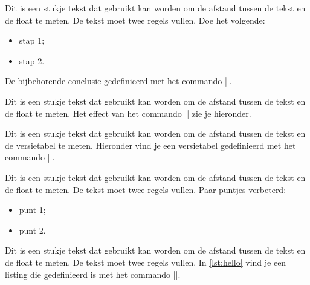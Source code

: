 \begin{llstShortInline}
Dit is een stukje tekst dat gebruikt kan worden om de afstand tussen de tekst en de float te meten. 
De tekst moet twee regels vullen. 
Doe het volgende:
\begin{itemize}
	\item stap 1;
	\item stap 2.
\end{itemize}

De bijbehorende conclusie gedefinieerd met het commando |\conclusie|.


Dit is een stukje tekst dat gebruikt kan worden om de afstand tussen de tekst en de float te meten. 
Het effect van het commando |\handtekening| zie je hieronder. 

\handtekening{}

\clearpage
Dit is een stukje tekst dat gebruikt kan worden om de afstand tussen de tekst en de versietabel te meten. 
Hieronder vind je een versietabel gedefinieerd met het commando |\versiehistorie|. 


Dit is een stukje tekst dat gebruikt kan worden om de afstand tussen de tekst en de float te meten. 
De tekst moet twee regels vullen. Paar puntjes verbeterd:
\begin{itemize}
	\item punt 1;
	\item punt 2.
\end{itemize}

\clearpage
Dit is een stukje tekst dat gebruikt kan worden om de afstand tussen de tekst en de float te meten. 
De tekst moet twee regels vullen. 
In \cref{lst:hello} vind je een listing die gedefinieerd is met het commando |\floatlstinput|.


\end{llstShortInline}
